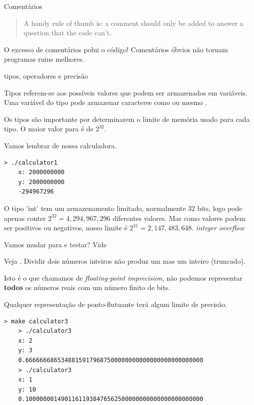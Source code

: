 \documentclass{beamer}
\begin{document}
\begin{frame}{Comentários}

  \begin{quote}
    A handy rule of thumb is: a comment should only be added to answer
    a question that the code can't.
  \end{quote}

  O excesso de comentários polui o código! Comentários óbvios não
  tornam programas ruins melhores.

\end{frame}


\begin{frame}{tipos, operadores e precisão}

  Tipos referem-se aos possíveis valores que podem ser armazenados em
  variáveis. Uma variável do tipo  pode armazenar
  caracteres como  ou mesmo .

  Os tipos são importante por determinarem o limite de memória usado
  para cada tipo. O maior valor para  é de $2^{32}$.

  \framebreak

  Vamos lembrar de nossa calculadora.

  \begin{lstlisting}[style=code]
    > ./calculator1
    x: 2000000000
    y: 2000000000
    -294967296
  \end{lstlisting}
  
  O tipo 'int' tem um armazenamento limitado, normalmente 32 bits,
  logo pode apenas conter $2^{32} = 4,294,967,296$ diferentes
  valores. Mas como valores podem ser positivos ou negativos, nosso
  limite é $2^{31} = 2,147,483,648$. \emph{integer overflow}

  Vamos mudar para  e testar? Vide 

  \framebreak

  Veja .  Dividir dois números inteiros não
  produz um  mas um inteiro (truncado).

  Isto é o que chamamos de \emph{floating-point imprecision}, não podemos
  representar \textbf{todos} os números reais com um número finito de
  bits.

  Qualquer representação de ponto-flutuante terá algum limite de
  precisão.

  \begin{lstlisting}[style=code,basicstyle=\ttfamily\tiny]
    > make calculator3
    > ./calculator3
    x: 2
    y: 3
    0.66666668653488159179687500000000000000000000000000
    > ./calculator3
    x: 1
    y: 10
    0.10000000149011611938476562500000000000000000000000
  \end{lstlisting}


\end{frame}
\end{document}
